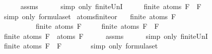 \begin{isabellebody}
\ \ \ \ \isamarkupfalse%
\ assms\isanewline
\ \ \ \ \isamarkupfalse%
\ {\isacharparenleft}simp\ only{\isacharcolon}\ finite{\isacharunderscore}UnI{\isacharparenright}\isanewline
\ \ \isamarkupfalse%
\ \isamarkupfalse%
\ {\isachardoublequoteopen}finite\ {\isacharparenleft}atoms\ {\isacharparenleft}F{}\ \isactrlbold {\isasymand}\ F{}{\isacharparenright}{\isacharparenright}{\isachardoublequoteclose}\ \ \isanewline
\ \ \ \ \isamarkupfalse%
\ {\isacharparenleft}simp\ only{\isacharcolon}\ formula{\isachardot}set{\isacharparenleft}{}{\isacharparenright}{\isacharparenright}\isanewline
{}\isamarkupfalse%
%
\endisatagproof
{\isafoldproof}%
%
\isadelimproof
\isanewline
%
\endisadelimproof
\isanewline
{}\isamarkupfalse%
\ atoms{\isacharunderscore}finite{\isacharunderscore}or{\isacharcolon}\isanewline
\ \ \ {\isachardoublequoteopen}finite\ {\isacharparenleft}atoms\ F{}{\isacharparenright}{\isachardoublequoteclose}\isanewline
\ \ \ \ \ \ \ \ \ \ {\isachardoublequoteopen}finite\ {\isacharparenleft}atoms\ F{}{\isacharparenright}{\isachardoublequoteclose}\isanewline
\ \ \ \ \ {\isachardoublequoteopen}finite\ {\isacharparenleft}atoms\ {\isacharparenleft}F{}\ \isactrlbold {\isasymor}\ F{}{\isacharparenright}{\isacharparenright}{\isachardoublequoteclose}\isanewline
%
\isadelimproof
%
\endisadelimproof
%
\isatagproof
{}\isamarkupfalse%
\ {\isacharminus}\isanewline
\ \ \isamarkupfalse%
\ {\isachardoublequoteopen}finite\ {\isacharparenleft}atoms\ F{}\ {\isasymunion}\ atoms\ F{}{\isacharparenright}{\isachardoublequoteclose}\isanewline
\ \ \ \ \isamarkupfalse%
\ assms\isanewline
\ \ \ \ \isamarkupfalse%
\ {\isacharparenleft}simp\ only{\isacharcolon}\ finite{\isacharunderscore}UnI{\isacharparenright}\isanewline
\ \ \isamarkupfalse%
\ \isamarkupfalse%
\ {\isachardoublequoteopen}finite\ {\isacharparenleft}atoms\ {\isacharparenleft}F{}\ \isactrlbold {\isasymor}\ F{}{\isacharparenright}{\isacharparenright}{\isachardoublequoteclose}\ \ \isanewline
\ \ \ \ \isamarkupfalse%
\ {\isacharparenleft}simp\ only{\isacharcolon}\ formula{\isachardot}set{\isacharparenleft}{}{\isacharparenright}{\isacharparenright}\isanewline
{}\isamarkupfalse%
%
\endisatagproof
{\isafoldproof}%
%
\isadelimproof

\end{isabellebody}
